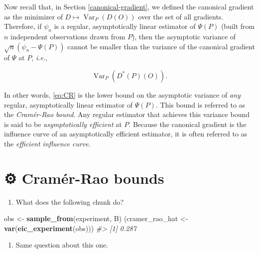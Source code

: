 \documentclass[11pt,openright,twoside]{book}
\newenvironment{Shaded}{\begin{snugshade}}{\end{snugshade}}
\newcommand{\CommentTok}[1]{\textcolor[rgb]{0.56,0.35,0.01}{\textit{#1}}}
\newcommand{\KeywordTok}[1]{\textcolor[rgb]{0.13,0.29,0.53}{\textbf{#1}}}
\newcommand{\NormalTok}[1]{#1}
\newcommand{\StringTok}[1]{\textcolor[rgb]{0.31,0.60,0.02}{#1}}
\providecommand{\tightlist}{%
  \setlength{\itemsep}{0pt}\setlength{\parskip}{0pt}}
\DeclareMathOperator{\Var}{Var}
\newcommand{\gear}{\usebox{\gearbox}\;}
\theoremstyle{definition}
\theoremstyle{definition}
\theoremstyle{definition}
\theoremstyle{remark}
\begin{document}
Now recall that, in Section \ref{canonical-gradient}, we defined the
canonical gradient as the minimizer of \(D \mapsto \Var_{P}(D(O))\) over the set
of all gradients. Therefore, if \(\psi_{n}\) is a regular, asymptotically linear
estimator of \(\Psi(P)\) (built from \(n\) independent observations drawn from
\(P\)), then the asymptotic variance of \(\sqrt{n} (\psi_{n} - \Psi(P))\) cannot
be smaller than the variance of the canonical gradient of \(\Psi\) at \(P\),
\emph{i.e.},

\begin{equation}
\label{eq:CR}\Var_{P}(D^{*}(P)(O)). 
\end{equation}

In other words, \eqref{eq:CR} is the lower bound on the asymptotic variance of
\emph{any} regular, asymptotically linear estimator of \(\Psi(P)\). This bound is
referred to as the \emph{Cramér-Rao bound}. Any regular estimator that achieves
this variance bound is said to be \emph{asymptotically efficient} at \(P\). Because
the canonical gradient is the influence curve of an asymptotically efficient
estimator, it is often referred to as the \emph{efficient influence curve}.

\hypertarget{exo-cramer-rao}{%
\section{\texorpdfstring{⚙ \gear Cramér-Rao bounds}{⚙ Cramér-Rao bounds}}\label{exo-cramer-rao}}

\begin{enumerate}
\def\labelenumi{\arabic{enumi}.}
\tightlist
\item
  What does the following chunk do?
\end{enumerate}

\begin{Shaded}
\begin{Highlighting}[]
\NormalTok{obs <-}\StringTok{ }\KeywordTok{sample_from}\NormalTok{(experiment, B)}
\NormalTok{(cramer_rao_hat <-}\StringTok{ }\KeywordTok{var}\NormalTok{(}\KeywordTok{eic_experiment}\NormalTok{(obs)))}
\CommentTok{#> [1] 0.287}
\end{Highlighting}
\end{Shaded}

\begin{enumerate}
\def\labelenumi{\arabic{enumi}.}
\setcounter{enumi}{1}
\tightlist
\item
  Same question about this one.
\end{enumerate}
\end{document}
